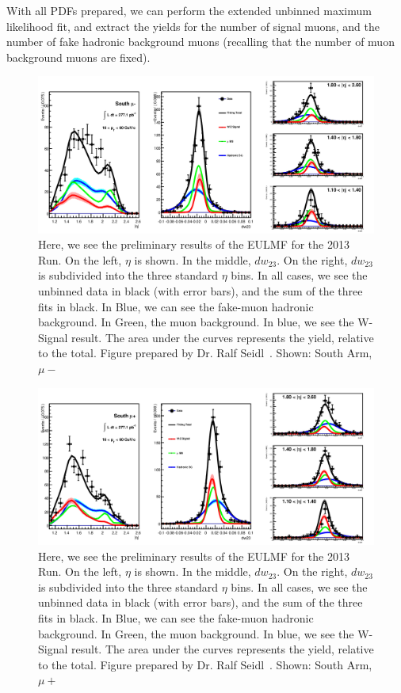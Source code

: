 With all PDFs prepared, we can perform the extended unbinned maximum likelihood
fit, and extract the yields for the number of signal muons, and the number of
fake hadronic background muons (recalling that the number of muon background
muons are fixed).

\begin{figure}
  \centering
  \includegraphics[width=\linewidth]{./figures/prelim_full_maxlikefit_a0q0.jpg}
  \caption{
    Here, we see the preliminary results of the EULMF for the 2013 Run. On the
    left, $\eta$ is shown. In the middle, $dw_{23}$. On the right, $dw_{23}$ is
    subdivided into the three standard $\eta$ bins. In all cases, we see the
    unbinned data in black (with error bars), and the sum of the three fits in
    black. In Blue, we can see the fake-muon hadronic background. In Green, the
    muon background. In blue, we see the W-Signal result. The area under the
    curves represents the yield, relative to the total. Figure prepared by Dr.
    Ralf Seidl~\cite{Seidl2014a}. Shown: South Arm, $\mu-$
  }
  \label{fig:maxlikefit_a0q0}
\end{figure}

\begin{figure}
  \centering
  \includegraphics[width=\linewidth]{./figures/prelim_full_maxlikefit_a0q1.jpg}
  \caption{
    Here, we see the preliminary results of the EULMF for the 2013 Run. On the
    left, $\eta$ is shown. In the middle, $dw_{23}$. On the right, $dw_{23}$ is
    subdivided into the three standard $\eta$ bins. In all cases, we see the
    unbinned data in black (with error bars), and the sum of the three fits in
    black. In Blue, we can see the fake-muon hadronic background. In Green, the
    muon background. In blue, we see the W-Signal result. The area under the
    curves represents the yield, relative to the total. Figure prepared by Dr.
    Ralf Seidl~\cite{Seidl2014a}. Shown: South Arm, $\mu+$
  }
  \label{fig:maxlikefit_a0q1}
\end{figure}

